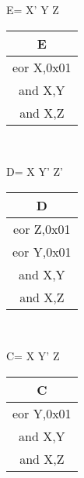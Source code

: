 \documentclass[journal,12pt,twocolumn]{IEEEtran}
\begin{document}
  \begin{center}
      E= X' Y Z
      \begin{table}[h]
                \centering
                \begin{tabular}{|c|}
                \hline
                E \\
                \hline
                     eor X,0x01\\
                     
                     and X,Y\\
                     and X,Z\\
                     \hline
                \end{tabular}
            \end{table}\\ 
 \end{center}
  \begin{center}
     D= X Y' Z'
     \begin{table}[h]
                \centering
                \begin{tabular}{|c|}
                \hline
                D \\
                \hline
                     eor Z,0x01\\
                     eor Y,0x01\\
                     
                     and X,Y\\
                     and X,Z\\
                     \hline
                \end{tabular}
            \end{table}\\ 
 \end{center}
  \begin{center}
     C= X Y' Z
     \begin{table}[h]
                \centering
                \begin{tabular}{|c|}
                \hline
                C \\
                \hline
                    
                     eor Y,0x01\\
                     
                     and X,Y\\
                     and X,Z\\
                     \hline
                \end{tabular}
            \end{table}\\ 
 \end{center}
 
\end{document}
